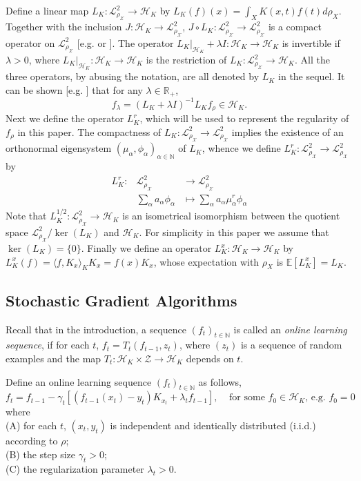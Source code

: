 \documentclass[twoside,11pt]{amsart}
\theoremstyle{theorem}
\theoremstyle{definition}
\theoremstyle{remark}
\newcommand{\DS}{\displaystyle}
\def\Z{{\mathbb Z}}        %
\def\R{{\mathbb R}}        %
\def\<{{\langle}}
\def\>{{\rangle}}
\def\E{{\mathbb E}}        %
\def\L{{\mathscr L}}
\def\L2{{\mathscr L}^2_{\rho_\X}}
\def\H{{\mathscr H}}
\def\X{{\mathscr X}}
\def\Z{{\mathscr Z}}
\def\N{{\mathbb N}}
\def\al{\alpha}
\def\la{\lambda}
\begin{document}
Define a linear map
$L_K:\L2\to \H_K$ by $L_K(f)(x)= \int_X K(x,t) f(t) d
\rho_X$. Together with the inclusion $J:\H_K \to \L2$, $J\circ L_K:\L2 \to \L2$
is a compact operator on $\L2$ [e.g.  or ]. The operator $L_K|_{\H_K} + \lambda I:\H_K \to \H_K$ is invertible if $\lambda>0$,
where $L_K|_{\H_K}:\H_K \to \H_K$ is the restriction of $L_K:\L2
\to \H_K$. All the three operators, by abusing the notation, are all denoted by $L_K$ in the sequel. 
It can be shown [e.g. ] that for any $\la\in \R_+$,
\begin{equation} 
f_{\la} = (L_K + \la I)^{-1} L_K f_\rho \in \H_K. 
\end{equation}
Next we define the operator $L_K^r$, which will be used to represent the regularity of $f_\rho$
in this paper. The compactness of $L_K:\L2\to \L2$ implies the existence of an orthonormal eigensystem $(\mu_\al,\phi_\al)_{\al\in \N}$ of $L_K$, whence
we define $L_K^r:\L2\to\L2$ by
\begin{equation} \label{eq:LKr}
\begin{array}{rcl}
L_K^r: & \L2 & \to \L2 \\ 
& \DS \sum_{\al} a_\al \phi_\al & \DS \mapsto \sum_\al a_\al \mu_\al^r \phi_\al 
\end{array}
\end{equation}
Note that $L_K^{1/2}:\L2\to \H_K$ is an isometrical isomorphism between the quotient space $\L2/\ker(L_K)$ and $\H_K$. For simplicity in this paper
we assume that $\ker(L_K)=\{0\}$.
Finally we define an operator $L_K^x:\H_K \to \H_K$ by $L_K^x(f) = \<f,K_x\>_K K_x=f(x)K_x$, whose expectation with $\rho_X$ is $\E[L_K^x]=L_K$. 

\subsection{Stochastic Gradient Algorithms}

Recall that in the introduction, a sequence $(f_t)_{t\in \N}$ is called an \emph{online learning sequence}, if for
each $t$, $f_t = T_t ( f_{t-1}, z_t)$, where $(z_t)$ is a sequence of random examples and the map $T_t: \H_K \times \Z  \to \H_K$ depends on $t$. 

Define an online learning sequence $(f_t)_{t\in\N}$ as follows,
\begin{equation}\label{eq:ft}
f_t = f_{t-1} - \gamma_t [(f_{t-1}(x_t)-y_t)K_{x_t} +\lambda_t f_{t-1}], \ \ \ \ \ \mbox{for some $f_0\in \H_K$, e.g. $f_0=0$}
\end{equation}
where \\
(A) for each $t$, $(x_t,y_t)$ is independent and identically distributed (i.i.d.) according to $\rho$; \\
(B) the step size $\gamma_t>0$; \\
(C) the regularization parameter $\lambda_t>0$. 
\end{document}
